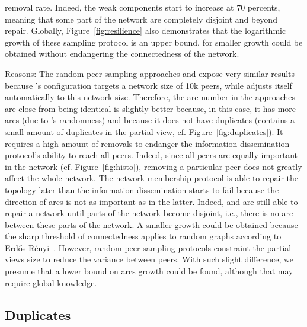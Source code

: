\begin{asparadesc}
  removal rate. Indeed, the weak components start to increase at 70 percents,
  meaning that some part of the network are completely disjoint and beyond
  repair. Globally, Figure~\ref{fig:resilience} also demonstrates that the
  logarithmic growth of these sampling protocol is an upper bound, for smaller
  growth could be obtained without endangering the connectedness of the network.
\item[Reasons:] The random peer sampling approaches \CYCLON and \SPRAY expose
  very similar results because \CYCLON's configuration targets a network size of
  10k peers, while \SPRAY adjusts itself automatically to this network size.
  Therefore, the arc number in the approaches are close from being identical
  \CYCLON is slightly better because, in this case, it has more arcs (due to
  \SPRAY's randomness) and because it does not have duplicates (\SPRAY contains
  a small amount of duplicates in the partial view,
  cf. Figure~\ref{fig:duplicates}). It requires a high amount of removals to
  endanger the information dissemination protocol's ability to reach all
  peers. Indeed, since all peers are equally important in the network
  (cf. Figure~\ref{fig:histo}), removing a particular peer does not greatly
  affect the whole network. The network membership protocol is able to repair
  the topology later than the information dissemination starts to fail because
  the direction of arcs is not as important as in the latter. Indeed, \CYCLON
  and \SPRAY are still able to repair a network until parts of the network
  become disjoint, i.e., there is no arc between these parts of the network.  A
  smaller growth could be obtained because the sharp threshold of connectedness
  applies to random graphs according to Erd{\H o}s-R{\'
    e}nyi~\cite{erdos1959random}. However, random peer sampling protocols
  constraint the partial views size to reduce the variance between peers.  With
  such slight difference, we presume that a lower bound on arcs growth could be
  found, although that may require global knowledge.
\end{asparadesc}


\subsection{Duplicates}

